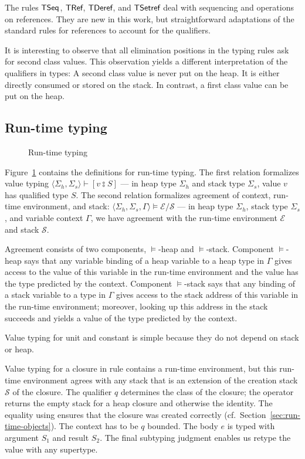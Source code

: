 \documentclass[sigplan,dvipsnames,screen]{acmart}
\begin{document}
The rules $\ACTSeq$, $\ACTRef$, $\ACTDeref$, and $\ACTSetref$ deal
with sequencing and operations on references. They are new in this
work, but straightforward adaptations of the standard rules for
references to account for the qualifiers.

It is interesting to observe that all elimination positions in the
typing rules ask for second class values. This observation yields a
different interpretation of the qualifiers in types: A second class
value is never put on the heap. It is either directly consumed or
stored on the stack. In contrast, a first class value can be put on
the heap.

\subsection{Run-time typing}
\label{sec:run-time-typing}
\begin{figure}[tp]
  \ValueTyping
  \caption{Run-time typing}
  \label{fig:run-time-typing}
\end{figure}

Figure~\ref{fig:run-time-typing} contains the definitions for run-time
typing. The first relation formalizes value typing $\langle \Sigma_h,
\Sigma_s \rangle\vdash{[ v \typecolon S]}$ --- in heap type $\Sigma_h$
and stack type $\Sigma_s$, value $v$ has qualified type $S$. The
second relation formalizes agreement of context, run-time environment,
and stack: $\langle \Sigma_h , \Sigma_s,
\Gamma\rangle\models\mathcal{E}/\mathcal{S}$ --- in heap type
$\Sigma_h$, stack type $\Sigma_s$, and variable context $\Gamma$, we
have agreement with the run-time environment $\mathcal{E}$ and stack
$\mathcal{S}$.

Agreement consists of two components, $\models$-heap and
$\models$-stack.
Component $\models$-heap says that any variable binding of a heap variable to a
heap type in $\Gamma$ gives access to the value of this variable in
the run-time environment and the value has the type predicted by the
context.
Component $\models$-stack says that any binding of a stack variable to a type in
$\Gamma$ gives access to the stack address of this variable in the
run-time environment; moreover, looking up this address in the stack
succeeds and yields a value of the type predicted by the context.

Value typing for unit and constant is simple because they do not
depend on stack or heap.

Value typing for a closure in rule {\ACTVClos} contains a run-time
environment, but this run-time environment agrees with any stack that
is an extension of the creation stack $\mathcal{S}$ of the
closure. The qualifier $q$ determines the class of the closure; the
 operator returns the empty stack for a heap closure
and otherwise the identity. The  equality using 
ensures that the closure was created correctly (cf.\ Section~\ref{sec:run-time-objects}).
The context has to be $q$ bounded.
The body $e$ is typed with argument $S_1$ and result $S_2$.
The final subtyping judgment enables us retype the value with any
supertype.
\end{document}
